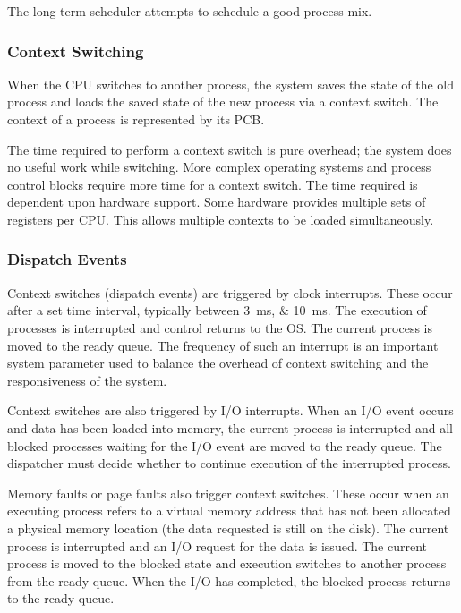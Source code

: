 The long-term scheduler attempts to schedule a good process mix.

\subsubsection{Context Switching}

When the CPU switches to another process, the system saves the state of the old process and loads the saved state of the new process via a context switch.
The context of a process is represented by its PCB.

The time required to perform a context switch is pure overhead; the system does no useful work while switching.
More complex operating systems and process control blocks require more time for a context switch.
The time required is dependent upon hardware support.
Some hardware provides multiple sets of registers per CPU.
This allows multiple contexts to be loaded simultaneously.

\subsubsection{Dispatch Events}

Context switches (dispatch events) are triggered by clock interrupts.
These occur after a set time interval, typically between \SIlist{3;10}{\milli\second}.
The execution of processes is interrupted and control returns to the OS.
The current process is moved to the ready queue.
The frequency of such an interrupt is an important system parameter used to balance the overhead of context switching and the responsiveness of the system.

Context switches are also triggered by I/O interrupts.
When an I/O event occurs and data has been loaded into memory, the current process is interrupted and all blocked processes waiting for the I/O event are moved to the ready queue.
The dispatcher must decide whether to continue execution of the interrupted process.

Memory faults or page faults also trigger context switches.
These occur when an executing process refers to a virtual memory address that has not been allocated a physical memory location (the data requested is still on the disk).
The current process is interrupted and an I/O request for the data is issued.
The current process is moved to the blocked state and execution switches to another process from the ready queue.
When the I/O has completed, the blocked process returns to the ready queue.

